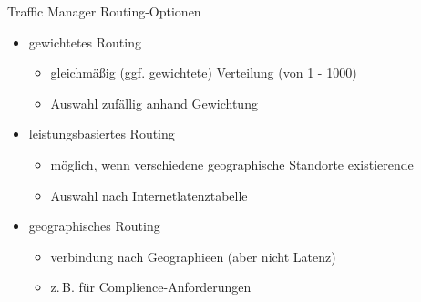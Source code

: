 \begin{flashcard}[Definition]{Traffic Manager Routing-Optionen}
    \begin{itemize}
        \item gewichtetes Routing
            \begin{itemize}
                \item gleichmäßig (ggf. gewichtete) Verteilung\newline
                    (von 1 - 1000)
                \item Auswahl zufällig anhand Gewichtung
            \end{itemize}
        \item leistungsbasiertes Routing
            \begin{itemize}
                \item möglich, wenn verschiedene geographische Standorte existierende
                \item Auswahl nach Internetlatenztabelle
            \end{itemize}
        \item geographisches Routing
            \begin{itemize}
                \item verbindung nach Geographieen (aber nicht Latenz)
                \item z.\,B. für Complience-Anforderungen
            \end{itemize}
    \end{itemize}
\end{flashcard}

